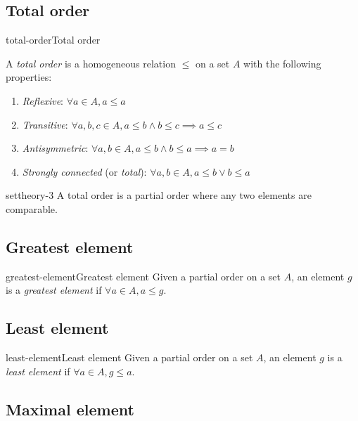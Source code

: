 \documentclass[preview]{standalone}
\begin{document}
\subsection{Total order}

\begin{snippetdefinition}{total-order}{Total order}{
    A \textit{total order} is a homogeneous relation \(\leq\) on a set \(A\)
    with the following properties:
    
    \begin{enumerate}
        \item \textit{Reflexive}: \(\forall a \in A, a \leq a\)
        \item \textit{Transitive}: \(\forall a,b,c \in A, a \leq b \land b \leq c \implies a \leq c\)
        \item \textit{Antisymmetric}: \(\forall a,b \in A, a \leq b \land b \leq a \implies a=b\)
        \item \textit{Strongly connected} (or \textit{total}): \(\forall a,b\in A, a \leq b \lor b\leq a\)
    \end{enumerate}
}
\end{snippetdefinition}

\begin{snippet}{settheory-3}
A total order is a partial order where any two elements are comparable.
\end{snippet}

\subsection{Greatest element}

\begin{snippetdefinition}{greatest-element}{Greatest element}{
    Given a partial order on a set \(A\), an element \(g\) is a \textit{greatest element}
    if \(\forall a\in A, a \leq g\).
}
\end{snippetdefinition}

\subsection{Least element}

\begin{snippetdefinition}{least-element}{Least element}{
    Given a partial order on a set \(A\), an element \(g\) is a \textit{least element}
    if \(\forall a\in A, g \leq a\).
}
\end{snippetdefinition}

\subsection{Maximal element}
\end{document}
